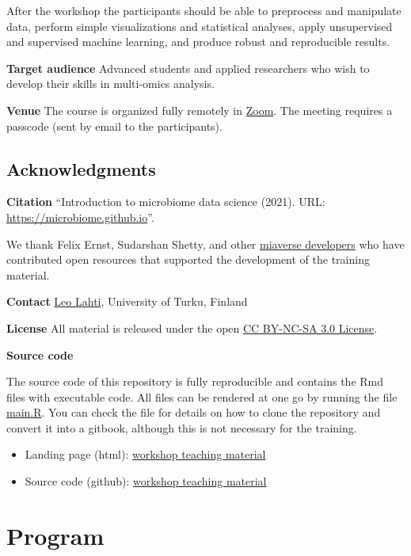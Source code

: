 \documentclass[
  oneside]{book}
\providecommand{\tightlist}{%
  \setlength{\itemsep}{0pt}\setlength{\parskip}{0pt}}
\begin{document}
After the workshop the participants should be able to preprocess and manipulate data,
perform simple visualizations and statistical analyses, apply unsupervised and supervised
machine learning, and produce robust and reproducible results.

\textbf{Target audience}
Advanced students and applied researchers who wish
to develop their skills in multi-omics analysis.

\textbf{Venue}
The course is organized fully remotely in \href{https://utu.zoom.us/j/63432425453}{Zoom}.
The meeting requires a passcode (sent by email to the participants).

\hypertarget{acknowledgments}{%
\section{Acknowledgments}\label{acknowledgments}}

\textbf{Citation} ``Introduction to microbiome data science (2021). URL: \url{https://microbiome.github.io}''.

\citet{FindingPheno2022workshop}

We thank Felix Ernst, Sudarshan Shetty, and other \href{https://microbiome.github.io}{miaverse
developers} who have contributed open
resources that supported the development of the training material.

\textbf{Contact} \href{http://datascience.utu.fi}{Leo Lahti}, University of Turku, Finland

\textbf{License} All material is released under the open \href{LICENSE}{CC BY-NC-SA 3.0 License}.

\textbf{Source code}

The source code of this repository is fully reproducible and contains
the Rmd files with executable code. All files can be rendered at one
go by running the file \url{main.R}. You can check the file for
details on how to clone the repository and convert it into a gitbook,
although this is not necessary for the training.

\begin{itemize}
\tightlist
\item
  Landing page (html): \href{https://microbiome.github.io/course_2022_FindingPheno/}{workshop teaching material}
\item
  Source code (github): \href{https://github.com/microbiome/course_2022_FindingPheno}{workshop teaching material}
\end{itemize}

\hypertarget{program}{%
\chapter{Program}\label{program}}
\end{document}
